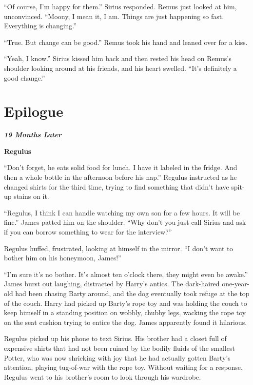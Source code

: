 \documentclass[12pt,twoside,openright]{memoir}
\begin{document}
``Of course, I'm happy for them.'' Sirius responded. Remus just looked at him, unconvinced. ``Moony, I mean it, I am. Things are just happening so fast. Everything is changing.'' 

``True. But change can be good.'' Remus took his hand and leaned over for a kiss.

``Yeah, I know.'' Sirius kissed him back and then rested his head on Remus's shoulder looking around at his friends, and his heart swelled. ``It's definitely a good change.''

\chapter*{Epilogue}

\textit{\textbf{19 Months Later} }

\textbf{Regulus} 

``Don't forget, he eats solid food for lunch. I have it labeled in the fridge. And then a whole bottle in the afternoon before his nap.'' Regulus instructed as he changed shirts for the third time, trying to find something that didn't have spit-up stains on it. 

``Regulus, I think I can handle watching my own son for a few hours. It will be fine.'' James patted him on the shoulder.
``Why don't you just call Sirius and ask if you can borrow something to wear for the interview?''

Regulus huffed, frustrated, looking at himself in the mirror. ``I don't want to bother him on his honeymoon, James!''

``I'm sure it's no bother. It's almost ten o'clock there, they might even be awake.'' James burst out laughing, distracted by Harry's antics. The dark-haired one-year-old had been chasing Barty around, and the dog eventually took refuge at the top of the couch. Harry had picked up Barty's rope toy and was holding the couch to keep himself in a standing position on wobbly, chubby legs, wacking the rope toy on the seat cushion trying to entice the dog. James apparently found it hilarious. 

Regulus picked up his phone to text Sirius. His brother had a closet full of expensive shirts that had not been ruined by the bodily fluids of the smallest Potter, who was now shrieking with joy that he had actually gotten Barty's attention, playing tug-of-war with the rope toy. Without waiting for a response, Regulus went to his brother's room to look through his wardrobe. 
\end{document}
